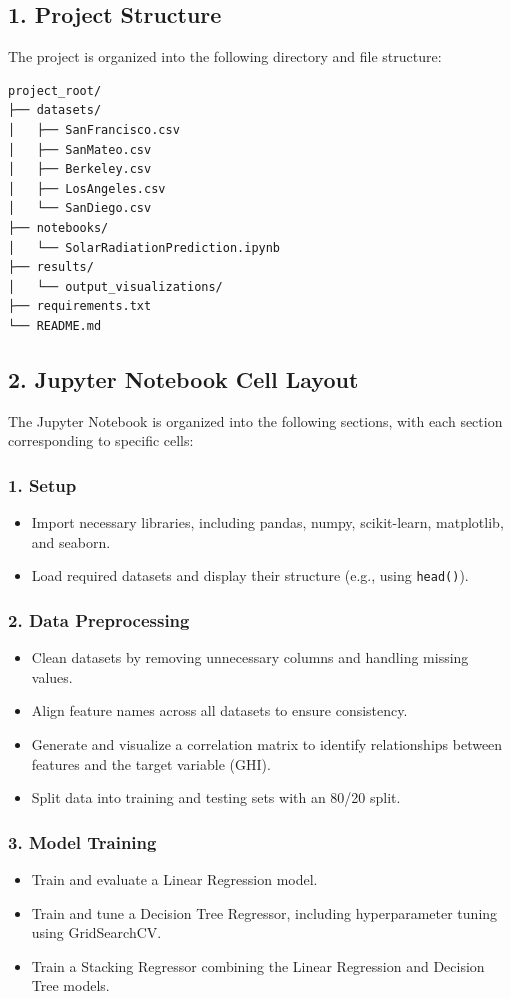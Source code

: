 \documentclass[10pt,twocolumn]{article}
\begin{document}
\subsection*{1. Project Structure}
The project is organized into the following directory and file structure:
\begin{verbatim}
project_root/
├── datasets/
│   ├── SanFrancisco.csv
│   ├── SanMateo.csv
│   ├── Berkeley.csv
│   ├── LosAngeles.csv
│   └── SanDiego.csv
├── notebooks/
│   └── SolarRadiationPrediction.ipynb
├── results/
│   └── output_visualizations/
├── requirements.txt
└── README.md
\end{verbatim}

\subsection*{2. Jupyter Notebook Cell Layout}
The Jupyter Notebook is organized into the following sections, with each section corresponding to specific cells:

\subsubsection*{1. Setup}
\begin{itemize}
    \item Import necessary libraries, including pandas, numpy, scikit-learn, matplotlib, and seaborn.
    \item Load required datasets and display their structure (e.g., using \texttt{head()}).
\end{itemize}

\subsubsection*{2. Data Preprocessing}
\begin{itemize}
    \item Clean datasets by removing unnecessary columns and handling missing values.
    \item Align feature names across all datasets to ensure consistency.
    \item Generate and visualize a correlation matrix to identify relationships between features and the target variable (GHI).
    \item Split data into training and testing sets with an 80/20 split.
\end{itemize}

\subsubsection*{3. Model Training}
\begin{itemize}
    \item Train and evaluate a Linear Regression model.
    \item Train and tune a Decision Tree Regressor, including hyperparameter tuning using GridSearchCV.
    \item Train a Stacking Regressor combining the Linear Regression and Decision Tree models.
\end{itemize}
\end{document}
